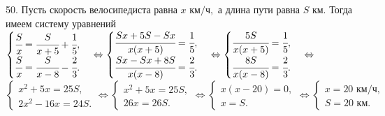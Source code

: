 50. Пусть скорость велосипедиста равна $x\text{ км/ч},$ а длина пути равна $S$ км. Тогда имеем систему уравнений
$\begin{cases}\cfrac{S}{x}=\cfrac{S}{x+5}+\cfrac{1}{5},\\ \cfrac{S}{x}=\cfrac{S}{x-8}-\cfrac{2}{3}.\end{cases}
\Leftrightarrow
\begin{cases}\cfrac{Sx+5S-Sx}{x(x+5)}=\cfrac{1}{5},\\ \cfrac{Sx-Sx+8S}{x(x-8)}=\cfrac{2}{3}.\end{cases}
\Leftrightarrow
\begin{cases}\cfrac{5S}{x(x+5)}=\cfrac{1}{5},\\ \cfrac{8S}{x(x-8)}=\cfrac{2}{3}.\end{cases}
\Leftrightarrow$\\$
\begin{cases}x^2+5x=25S,\\ 2x^2-16x=24S.\end{cases}
\Leftrightarrow
\begin{cases}x^2+5x=25S,\\ 26x=26S.\end{cases}
\Leftrightarrow
\begin{cases}x(x-20)=0,\\ x=S.\end{cases}
\Leftrightarrow
\begin{cases}x=20\text{ км/ч},\\ S=20\text{ км}.\end{cases}$\\
